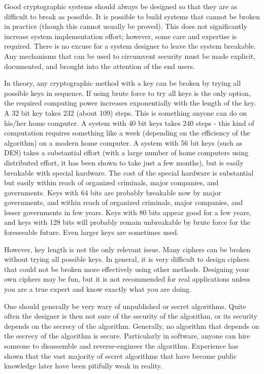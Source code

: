 \documentclass[12pt]{article}
\begin{document}
Good cryptographic systems should always be designed so that they are as difficult to break as possible. It is possible to build systems that cannot be broken in practice (though this cannot usually be proved). This does not significantly increase system implementation effort; however, some care and expertise is required. There is no excuse for a system designer to leave the system breakable. Any mechanisms that can be used to circumvent security must be made explicit, documented, and brought into the attention of the end users.

In theory, any cryptographic method with a key can be broken by trying all possible keys in sequence. If using brute force to try all keys is the only option, the required computing power increases exponentially with the length of the key. A 32 bit key takes 232 (about 109) steps. This is something anyone can do on his/her home computer. A system with 40 bit keys takes 240 steps - this kind of computation requires something like a week (depending on the efficiency of the algorithm) on a modern home computer. A system with 56 bit keys (such as DES) takes a substantial effort (with a large number of home computers using distributed effort, it has been shown to take just a few months), but is easily breakable with special hardware. The cost of the special hardware is substantial but easily within reach of organized criminals, major companies, and governments. Keys with 64 bits are probably breakable now by major governments, and within reach of organized criminals, major companies, and lesser governments in few years. Keys with 80 bits appear good for a few years, and keys with 128 bits will probably remain unbreakable by brute force for the foreseeable future. Even larger keys are sometimes used.

However, key length is not the only relevant issue. Many ciphers can be broken without trying all possible keys. In general, it is very difficult to design ciphers that could not be broken more effectively using other methods. Designing your own ciphers may be fun, but it is not recommended for real applications unless you are a true expert and know exactly what you are doing.

One should generally be very wary of unpublished or secret algorithms. Quite often the designer is then not sure of the security of the algorithm, or its security depends on the secrecy of the algorithm. Generally, no algorithm that depends on the secrecy of the algorithm is secure. Particularly in software, anyone can hire someone to disassemble and reverse-engineer the algorithm. Experience has shown that the vast majority of secret algorithms that have become
public knowledge later have been pitifully weak in reality.
\end{document}
